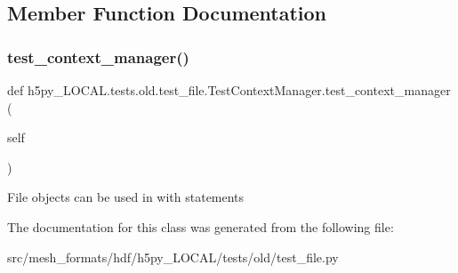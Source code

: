 \subsection{Member Function Documentation}
\mbox{\label{classh5py__LOCAL_1_1tests_1_1old_1_1test__file_1_1TestContextManager_a76d454a08ccd00d02787aa6710acb673}} 
\subsubsection{\texorpdfstring{test\+\_\+context\+\_\+manager()}{test\_context\_manager()}}
{\footnotesize\ttfamily def h5py\+\_\+\+L\+O\+C\+A\+L.\+tests.\+old.\+test\+\_\+file.\+Test\+Context\+Manager.\+test\+\_\+context\+\_\+manager (\begin{DoxyParamCaption}\item[{}]{self }\end{DoxyParamCaption})}

\begin{DoxyVerb}File objects can be used in with statements \end{DoxyVerb}
 

The documentation for this class was generated from the following file\+:\begin{DoxyCompactItemize}
\item 
src/mesh\+\_\+formats/hdf/h5py\+\_\+\+L\+O\+C\+A\+L/tests/old/test\+\_\+file.\+py\end{DoxyCompactItemize}
